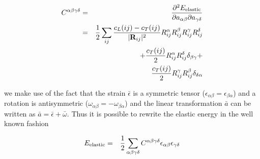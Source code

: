 \begin{eqnarray}\label{elconst}
C^{\alpha\beta\gamma\delta} &= &
\frac{\partial^2E_{\rm elastic}}{\partial a_{\alpha\beta} \partial a_{\gamma\delta}} \\
&=& \frac{1}{2}\sum_{ij}\frac{c_L(ij)-c_T(ij)}{|\mathbf R_{ij}|^2} 
R_{ij}^{\alpha}R_{ij}^{\beta}R_{ij}^{\gamma}R_{ij}^{\delta}
 \nonumber \\
&& +    \frac{c_T(ij)}{2} R_{ij}^{\alpha}R_{ij}^{\delta}
 \delta_{\beta\gamma}  + \nonumber \\
&& \frac{c_T(ij)}{2} R_{ij}^{\gamma} R_{ij}^{\beta}
 \delta_{\delta\alpha} 
\end{eqnarray}



we make use of the fact that the strain $\bar \epsilon$ is a symmetric 
tensor ($\epsilon_{\alpha\beta}=\epsilon_{\beta\alpha}$) and a rotation
is antisymmetric ($\omega_{\alpha\beta}=-\omega_{\beta\alpha}$) and 
the linear transformation $\bar a$ can be written as $\bar a=\bar \epsilon + \bar \omega$. Thus
it is possible to rewrite the elastic energy in the well known fashion

\begin{eqnarray}\label{Eelconst}
E_{\rm elastic} &=& \frac{1}{2}\sum_{\alpha\beta\gamma\delta} C^{\alpha\beta\gamma\delta} \epsilon_{\alpha\beta}\epsilon_{\gamma\delta}
\end{eqnarray}



